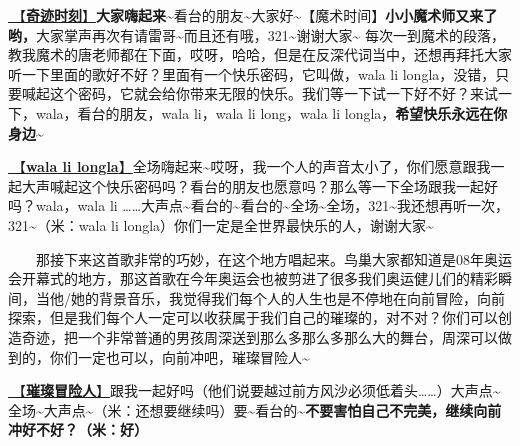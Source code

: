 \documentclass[]{ctexbook}
\begin{document}
\hyperref[magic-moment]{🎵【\textbf{奇迹时刻}】}\textbf{大家嗨起来\textasciitilde{}}看台的朋友\textasciitilde 大家好\textasciitilde【魔术时间】\textbf{小小魔术师又来了哟，}大家掌声再次有请雷哥\textasciitilde 而且还有哦，321\textasciitilde 谢谢大家\textasciitilde{}
每次一到魔术的段落，教我魔术的唐老师都在下面，哎呀，哈哈，但是在反深代词当中，还想再拜托大家听一下里面的歌好不好？里面有一个快乐密码，它叫做，wala li longla，没错，只要喊起这个密码，它就会给你带来无限的快乐。我们等一下试一下好不好？来试一下，wala，看台的朋友，wala li，wala li long，wala li longla，\textbf{希望快乐永远在你身边\textasciitilde{}}

\hyperref[wala-li-longla]{🎵【\textbf{wala li longla}】}全场嗨起来\textasciitilde 哎呀，我一个人的声音太小了，你们愿意跟我一起大声喊起这个快乐密码吗？看台的朋友也愿意吗？那么等一下全场跟我一起好吗？wala，wala li \ldots\ldots 大声点\textasciitilde 看台的\textasciitilde 看台的\textasciitilde 全场\textasciitilde 全场，321\textasciitilde 我还想再听一次，321\textasciitilde（米：wala li longla）你们一定是全世界最快乐的人，谢谢大家\textasciitilde{}

  那接下来这首歌非常的巧妙，在这个地方唱起来。鸟巢大家都知道是08年奥运会开幕式的地方，那这首歌在今年奥运会也被剪进了很多我们奥运健儿们的精彩瞬间，当他/她的背景音乐，我觉得我们每个人的人生也是不停地在向前冒险，向前探索，但是我们每个人一定可以收获属于我们自己的璀璨的，对不对？你们可以创造奇迹，把一个非常普通的男孩周深送到那么多那么多那么大的舞台，周深可以做到的，你们一定也可以，向前冲吧，璀璨冒险人\textasciitilde{}

\hyperref[adventurers]{🎵【\textbf{璀璨冒险人}】}跟我一起好吗（他们说要越过前方风沙必须低着头\ldots\ldots）大声点\textasciitilde 全场\textasciitilde 大声点\textasciitilde（米：还想要继续吗）要\textasciitilde 看台的\textasciitilde{}\textbf{不要害怕自己不完美，继续向前冲好不好？（米：好）}
\end{document}
